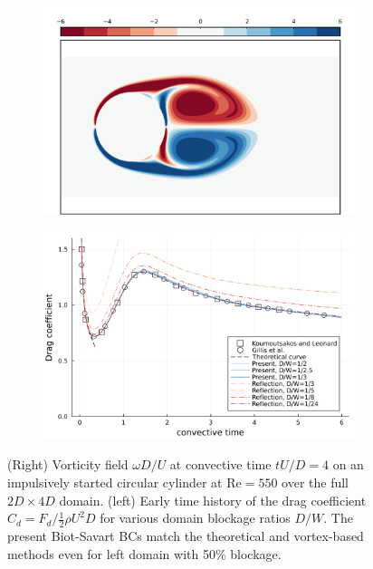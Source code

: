 \documentclass[final,1p,times]{elsarticle}
\begin{document}
\begin{figure}
    \centering
    \begin{subfigure}{.45\textwidth}
        \centering
        \includegraphics[width=\textwidth]{tex//fig/ImpCircle_4_vort.png}
    \end{subfigure}%
    \begin{subfigure}{.5\textwidth}
        \centering
        \includegraphics[width=\textwidth]{tex//fig/ImpCircle_Cd.png}
    \end{subfigure}%
    \caption{(Right) Vorticity field $\omega D/U$ at convective time $tU/D=4$
    on an impulsively started circular cylinder at $\text{Re}=550$ over the full $2D\times 4D$ domain. (left) Early time history of the drag coefficient $C_d=F_d/\frac 12 \rho U^2 D$ for various domain blockage ratios $D/W$. The present Biot-Savart BCs match the theoretical and vortex-based methods even for left domain with 50\% blockage.
    }
    \label{fig:cylinder_force}
\end{figure}
\end{document}
